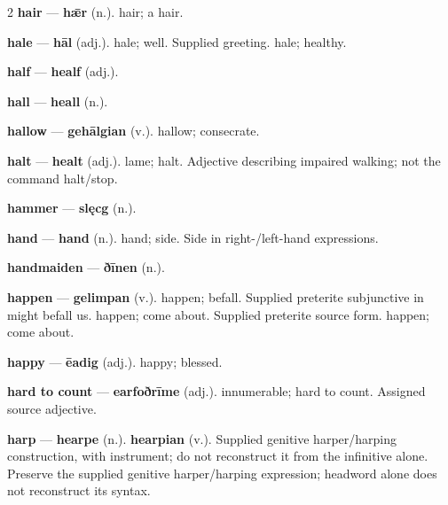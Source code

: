 \begin{multicols}{2}
\textbf{hair} — \textbf{hǣr} (n.). hair; a hair.\par
\textbf{hale} — \textbf{hāl} (adj.). hale; well. Supplied greeting. hale; healthy.\par
\textbf{half} — \textbf{healf} (adj.).\par
\textbf{hall} — \textbf{heall} (n.).\par
\textbf{hallow} — \textbf{gehālgian} (v.). hallow; consecrate.\par
\textbf{halt} — \textbf{healt} (adj.). lame; halt. Adjective describing impaired walking; not the command halt/stop.\par
\textbf{hammer} — \textbf{slęcg} (n.).\par
\textbf{hand} — \textbf{hand} (n.). hand; side. Side in right-/left-hand expressions.\par
\textbf{handmaiden} — \textbf{ðīnen} (n.).\par
\textbf{happen} — \textbf{gelimpan} (v.). happen; befall. Supplied preterite subjunctive in might befall us. happen; come about. Supplied preterite source form. happen; come about.\par
\textbf{happy} — \textbf{ēadig} (adj.). happy; blessed.\par
\textbf{hard to count} — \textbf{earfoðrīme} (adj.). innumerable; hard to count. Assigned source adjective.\par
\textbf{harp} — \textbf{hearpe} (n.).  \textbf{hearpian} (v.). Supplied genitive harper/harping construction, with instrument; do not reconstruct it from the infinitive alone. Preserve the supplied genitive harper/harping expression; headword alone does not reconstruct its syntax.\par

\end{multicols}
